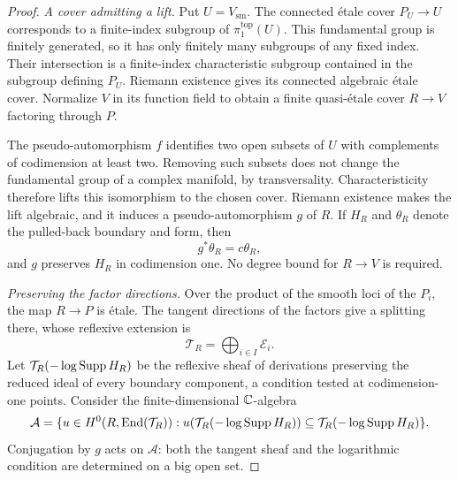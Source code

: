\begin{proof}
\emph{A cover admitting a lift.}
Put $U=V_{\mathrm{sm}}$.
The connected \'etale cover $P_U\to U$ corresponds to a finite-index
subgroup of $\pi_1^{\mathrm{top}}(U)$.  This fundamental group is
finitely generated, so it has only finitely many subgroups of any
fixed index.  Their intersection is a finite-index characteristic
subgroup contained in the subgroup defining $P_U$.  Riemann
existence gives its connected algebraic \'etale cover.  Normalize
$V$ in its function field to obtain a finite quasi-\'etale cover
$R\to V$ factoring through $P$.

The pseudo-automorphism $f$ identifies two open subsets of $U$ with
complements of codimension at least two.  Removing such subsets
does not change the fundamental group of a complex manifold, by
transversality.  Characteristicity therefore lifts this isomorphism
to the chosen cover.  Riemann existence makes the lift algebraic,
and it induces a pseudo-automorphism $g$ of $R$.  If $H_R$ and
$\theta_R$ denote the pulled-back boundary and form, then
\[
                 g^*\theta_R=c\theta_R,
\]
and $g$ preserves $H_R$ in codimension one.  No degree bound for
$R\to V$ is required.

\emph{Preserving the factor directions.}
Over the product of the smooth loci of the $P_i$, the map $R\to P$
is \'etale.  The tangent directions of the factors give a splitting
there, whose reflexive extension is
\[
                         \mathcal T_R=\bigoplus_{i\in I}\mathcal E_i.
\]
Let $\mathcal T_R(-\log\operatorname{Supp} H_R)$ be the reflexive sheaf of
derivations preserving the reduced ideal of every boundary component,
a condition tested at codimension-one points.  Consider the
finite-dimensional $\mathbb C$-algebra
\[
 \mathcal A=\{u\in H^0(R,\operatorname{End}(\mathcal T_R)):
 u(\mathcal T_R(-\log\operatorname{Supp} H_R))
       \subseteq\mathcal T_R(-\log\operatorname{Supp} H_R)\}.
\]
Conjugation by $g$ acts on $\mathcal A$: both the tangent sheaf and
the logarithmic condition are determined on a big open set.


\end{proof}
